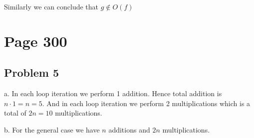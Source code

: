 \documentclass[a4paper]{report}
\begin{document}
Similarly we can conclude that $g \not \in O(f)$

\section*{Page 300}
\subsection*{Problem 5}
a. In each loop iteration we perform 1 addition. Hence total addition is $n \cdot  1 = n = 5$. And in each loop iteration we perform 2 multiplications which is a total of $2n = 10$ multiplications.


b.  For the general case we have $n$ additions and  $2n$ multiplications.
\end{document}

